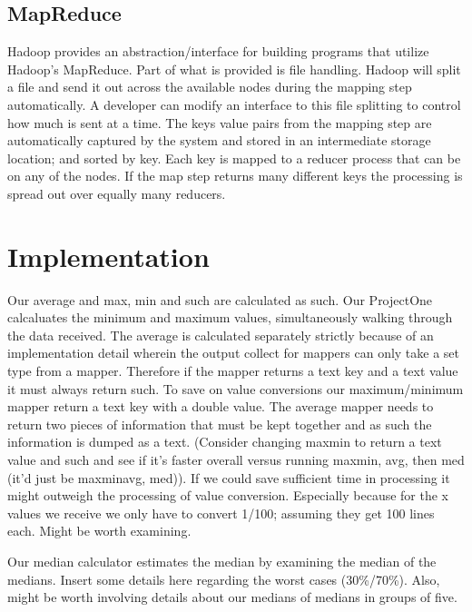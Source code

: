 \documentclass[11pt]{article}
\begin{document}
\subsection{MapReduce}
Hadoop provides an abstraction/interface for building programs that utilize Hadoop's MapReduce.  Part of what is provided is file handling.  Hadoop will split a file and send it out across the available nodes during the mapping step automatically.  A developer can modify an interface to this file splitting to control how much is sent at a time.  The keys value pairs from the mapping step are automatically captured by the system and stored in an intermediate storage location; and sorted by key.  Each key is mapped to a reducer process that can be on any of the nodes.  If the map step returns many different keys the processing is spread out over equally many reducers.

\section{Implementation}
Our average and max, min and such are calculated as such.  Our ProjectOne calcaluates the minimum and maximum values, simultaneously walking through the data received.  The average is calculated separately strictly because of an implementation detail wherein the output collect for mappers can only take a set type from a mapper.  Therefore if the mapper returns a text key and a text value it must always return such.  To save on value conversions our maximum/minimum mapper return a text key with a double value.  The average mapper needs to return two pieces of information that must be kept together and as such the information is dumped as a text.  (Consider changing maxmin to return a text value and such and see if it's faster overall versus running maxmin, avg, then med (it'd just be maxminavg, med)).  If we could save sufficient time in processing it might outweigh the processing of value conversion.  Especially because for the x values we receive we only have to convert 1/100; assuming they get 100 lines each.  Might be worth examining.

Our median calculator estimates the median by examining the median of the medians.  Insert some details here regarding the worst cases (30\%/70\%).  Also, might be worth involving details about our medians of medians in groups of five.
\end{document}
